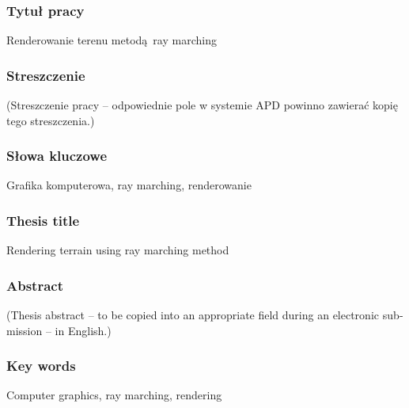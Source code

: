 \subsubsection*{Tytuł pracy} 
\Title Renderowanie terenu metodą ray marching

\subsubsection*{Streszczenie}  
(Streszczenie pracy – odpowiednie pole w systemie APD powinno zawierać kopię tego streszczenia.)

\subsubsection*{Słowa kluczowe} 
Grafika komputerowa, ray marching, renderowanie

\subsubsection*{Thesis title} 
\begin{otherlanguage}{british}
\TitleAlt Rendering terrain using ray marching method
\end{otherlanguage}

\subsubsection*{Abstract} 
\begin{otherlanguage}{british}
(Thesis abstract – to be copied into an appropriate field during an electronic submission – in English.)
\end{otherlanguage}
\subsubsection*{Key words}  
\begin{otherlanguage}{british}
Computer graphics, ray marching, rendering
\end{otherlanguage}

